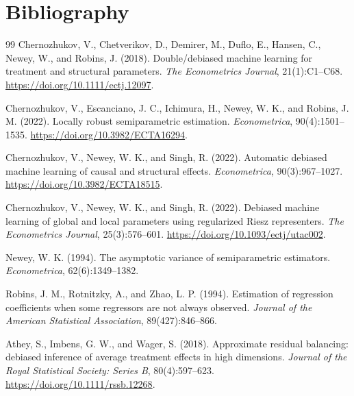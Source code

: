 \documentclass[11pt]{article}
\theoremstyle{definition}
\theoremstyle{plain}
\theoremstyle{remark}
\begin{document}
\section*{Bibliography}
\begin{thebibliography}{99}
Chernozhukov, V., Chetverikov, D., Demirer, M., Duflo, E., Hansen, C.,
Newey, W., and Robins, J. (2018).
\newblock Double/debiased machine learning for treatment and structural parameters.
\newblock \emph{The Econometrics Journal}, 21(1):C1--C68.
\newblock \url{https://doi.org/10.1111/ectj.12097}.

Chernozhukov, V., Escanciano, J. C., Ichimura, H., Newey, W. K., and
Robins, J. M. (2022).
\newblock Locally robust semiparametric estimation.
\newblock \emph{Econometrica}, 90(4):1501--1535.
\newblock \url{https://doi.org/10.3982/ECTA16294}.

Chernozhukov, V., Newey, W. K., and Singh, R. (2022).
\newblock Automatic debiased machine learning of causal and structural effects.
\newblock \emph{Econometrica}, 90(3):967--1027.
\newblock \url{https://doi.org/10.3982/ECTA18515}.

Chernozhukov, V., Newey, W. K., and Singh, R. (2022).
\newblock Debiased machine learning of global and local parameters using
regularized Riesz representers.
\newblock \emph{The Econometrics Journal}, 25(3):576--601.
\newblock \url{https://doi.org/10.1093/ectj/utac002}.

Newey, W. K. (1994).
\newblock The asymptotic variance of semiparametric estimators.
\newblock \emph{Econometrica}, 62(6):1349--1382.

Robins, J. M., Rotnitzky, A., and Zhao, L. P. (1994).
\newblock Estimation of regression coefficients when some regressors are not
always observed.
\newblock \emph{Journal of the American Statistical Association}, 89(427):846--866.

Athey, S., Imbens, G. W., and Wager, S. (2018).
\newblock Approximate residual balancing: debiased inference of average
treatment effects in high dimensions.
\newblock \emph{Journal of the Royal Statistical Society: Series B},
80(4):597--623.
\newblock \url{https://doi.org/10.1111/rssb.12268}.


\end{thebibliography}
\end{document}
